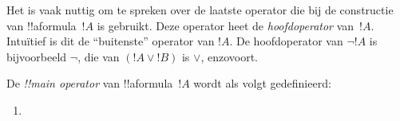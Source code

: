 \documentclass[openany]{memoir}
\begin{document}
\begingroup
\def\olfilename{OLP-0154}
\def\olfilepath{content/first-order-logic/syntax-and-semantics/}
\hypertarget{unit-OLP-0154}{}





\begin{explain}
Het is vaak nuttig om te spreken over de laatste operator die bij de
constructie van !!a{formula}~$!A$ is gebruikt. Deze operator heet de
\emph{hoofdoperator} van~$!A$. Intuïtief is dit de ``buitenste''
operator van $!A$. De hoofdoperator van $\lnot !A$ is bijvoorbeeld
$\lnot$, die van $(!A \lor !B)$ is $\lor$, enzovoort.
\end{explain}


\begin{defn}
De \emph{!!{main operator}} van !!a{formula}~$!A$ wordt als volgt
gedefinieerd:
\begin{enumerate}
\item {}







\end{enumerate}
\end{defn}
\end{document}
